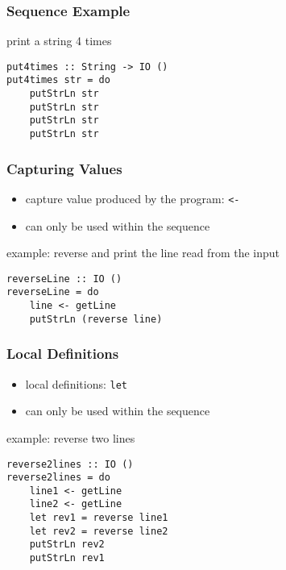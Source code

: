 \documentclass[dvipsnames]{beamer}
\theoremstyle{plain}
\begin{document}
\begin{frame}[fragile]
  \frametitle{Sequence Example}

  \begin{exampleblock}{print a string 4 times}
    \begin{lstlisting}
put4times :: String -> IO ()
put4times str = do
    putStrLn str
    putStrLn str
    putStrLn str
    putStrLn str
    \end{lstlisting}
  \end{exampleblock}
\end{frame}

\begin{frame}[fragile]
  \frametitle{Capturing Values}

  \begin{itemize}
    \item capture value produced by the program: \lstinline|<-|
    \item can only be used within the sequence
  \end{itemize}

  \begin{exampleblock}{example: reverse and print the line read from the input}
    \begin{lstlisting}
reverseLine :: IO ()
reverseLine = do
    line <- getLine
    putStrLn (reverse line)
    \end{lstlisting}
  \end{exampleblock}
\end{frame}

\begin{frame}[fragile]
  \frametitle{Local Definitions}

  \begin{itemize}
    \item local definitions: \lstinline|let|
    \item can only be used within the sequence
  \end{itemize}

  \begin{exampleblock}{example: reverse two lines}
    \begin{lstlisting}
reverse2lines :: IO ()
reverse2lines = do
    line1 <- getLine
    line2 <- getLine
    let rev1 = reverse line1
    let rev2 = reverse line2
    putStrLn rev2
    putStrLn rev1
    \end{lstlisting}
  \end{exampleblock}
\end{frame}
\end{document}
